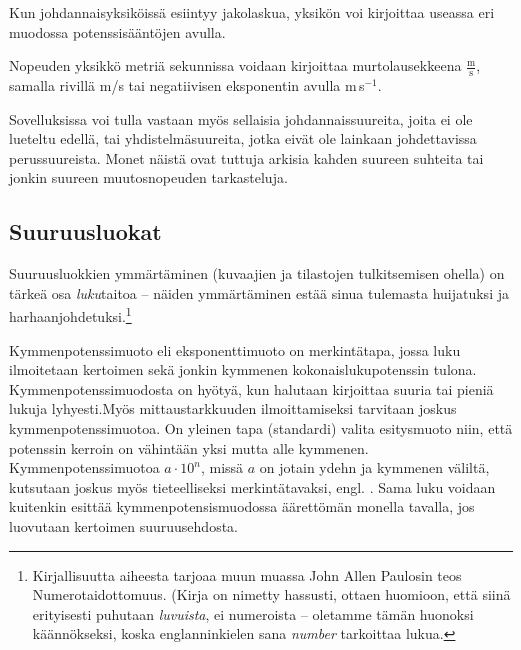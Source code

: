 Kun johdannaisyksiköissä esiintyy jakolaskua, yksikön voi kirjoittaa useassa eri muodossa potenssisääntöjen avulla.

\begin{esimerkki}
Nopeuden yksikkö metriä sekunnissa voidaan kirjoittaa murtolausekkeena $\frac{\text{m}}{\text{s}}$, samalla rivillä m/s tai negatiivisen eksponentin avulla m\,s$^{-1}$.
\end{esimerkki}

Sovelluksissa voi tulla vastaan myös sellaisia johdannaissuureita, joita ei ole lueteltu edellä, tai yhdistelmäsuureita, jotka eivät ole lainkaan johdettavissa perussuureista. Monet näistä ovat tuttuja arkisia kahden suureen suhteita tai jonkin suureen muutosnopeuden tarkasteluja.

\begin{esimerkki}
\end{esimerkki}

\subsection*{Suuruusluokat}

Suuruusluokkien ymmärtäminen (kuvaajien ja tilastojen tulkitsemisen ohella) on tärkeä osa \textit{luku}taitoa -- näiden ymmärtäminen estää sinua tulemasta huijatuksi ja harhaanjohdetuksi.\footnote{Kirjallisuutta aiheesta tarjoaa muun muassa John Allen Paulosin teos Numerotaidottomuus. (Kirja on nimetty hassusti, ottaen huomioon, että siinä erityisesti puhutaan \textit{luvuista}, ei numeroista -- oletamme tämän huonoksi käännökseksi, koska englanninkielen sana \textit{number} tarkoittaa lukua.}

Kymmenpotenssimuoto eli eksponenttimuoto on merkintätapa, jossa luku ilmoitetaan kertoimen sekä jonkin kymmenen kokonaislukupotenssin tulona. Kymmenpotenssimuodosta on hyötyä, kun halutaan kirjoittaa suuria tai pieniä lukuja lyhyesti.Myös mittaustarkkuuden ilmoittamiseksi tarvitaan joskus kymmenpotenssimuotoa. On yleinen tapa (standardi) valita esitysmuoto niin, että potenssin kerroin on vähintään yksi mutta alle kymmenen. Kymmenpotenssimuotoa $a\cdot 10^n$, missä $a$ on jotain ydehn ja kymmenen väliltä, kutsutaan joskus myös tieteelliseksi merkintätavaksi, engl. . Sama luku voidaan kuitenkin esittää kymmenpotensismuodossa äärettömän monella tavalla, jos luovutaan kertoimen suuruusehdosta.

